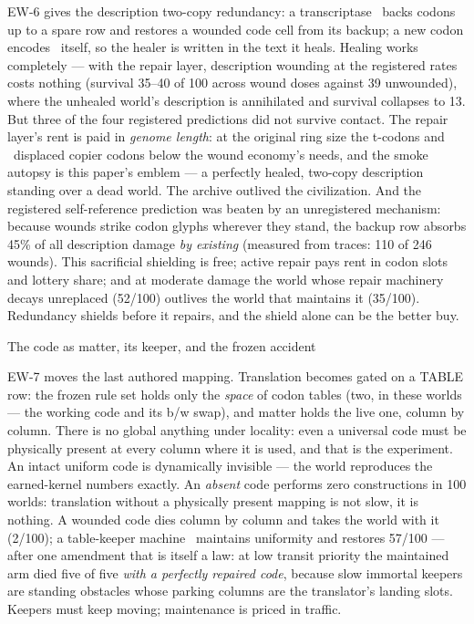 EW-6 gives the description two-copy redundancy: a transcriptase
\Ph\ backs codons up to a spare row and restores a wounded code
cell from its backup; a new codon  encodes \Ph\ itself, so
the healer is written in the text it heals. Healing works
completely --- with the repair layer, description wounding at the
registered rates costs nothing (survival 35--40 of 100 across
wound doses against 39 unwounded), where the unhealed world's
description is annihilated and survival collapses to 13. But
three of the four registered predictions did not survive contact.
The repair layer's rent is paid in {\it genome length}: at the
original ring size the t-codons and \Ph\ displaced copier codons
below the wound economy's needs, and the smoke autopsy is this
paper's emblem --- a perfectly healed, two-copy description
standing over a dead world. The archive outlived the
civilization. And the registered self-reference prediction was
beaten by an unregistered mechanism: because wounds strike codon
glyphs wherever they stand, the backup row absorbs 45\% of all
description damage {\it by existing} (measured from traces:
110 of 246 wounds). This sacrificial shielding is free; active
repair pays rent in codon slots and lottery share; and at
moderate damage the world whose repair machinery decays
unreplaced (52/100) outlives the world that maintains it
(35/100). Redundancy shields before it repairs, and the shield
alone can be the better buy.

\sec The code as matter, its keeper, and the frozen accident

EW-7 moves the last authored mapping. Translation becomes gated
on a TABLE row: the frozen rule set holds only the {\it space} of
codon tables (two, in these worlds --- the working code and its
b/w swap), and matter holds the live one, column by column. There
is no global anything under locality: even a universal code must
be physically present at every column where it is used, and that
is the experiment. An intact uniform code is dynamically
invisible --- the world reproduces the earned-kernel numbers
exactly. An {\it absent} code performs zero constructions in 100
worlds: translation without a physically present mapping is not
slow, it is nothing. A wounded code dies column by column and
takes the world with it (2/100); a table-keeper machine \Xc\
maintains uniformity and restores 57/100 --- after one amendment
that is itself a law: at low transit priority the maintained arm
died five of five {\it with a perfectly repaired code}, because
slow immortal keepers are standing obstacles whose parking
columns are the translator's landing slots. Keepers must keep
moving; maintenance is priced in traffic.

